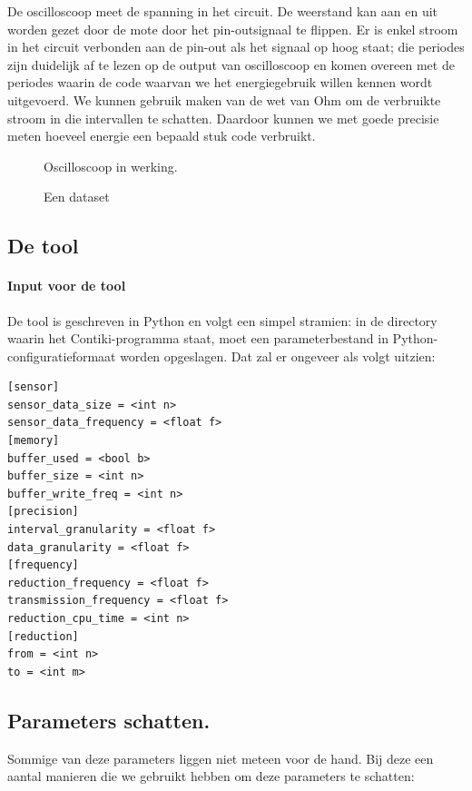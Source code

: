 \documentclass[11pt]{article}
\begin{document}
De oscilloscoop meet de spanning in het circuit. De weerstand kan aan en uit
worden gezet door de mote door het pin-outsignaal te flippen. Er is enkel stroom
in het circuit verbonden aan de pin-out als het signaal op hoog staat; die
periodes zijn duidelijk af te lezen op de output van oscilloscoop en komen
overeen met de periodes waarin de code waarvan we het energiegebruik willen
kennen wordt uitgevoerd. We kunnen gebruik maken van de wet van Ohm om de
verbruikte stroom in die intervallen te schatten. Daardoor kunnen we met goede
precisie meten hoeveel energie een bepaald stuk code verbruikt.
\begin{figure}[h]
\centering
\missingfigure{}
\caption{Oscilloscoop in werking.}
\label{fig:osc_werking}
\end{figure}

\begin{figure}[h]
\centering
\missingfigure{}
\caption{Een dataset}
\label{fig:data}
\end{figure}
\subsection{De tool}

\paragraph{Input voor de tool}
De tool is geschreven in Python en volgt een simpel stramien: in de directory
waarin het Contiki-programma staat, moet een parameterbestand in
Python-configuratieformaat worden opgeslagen. Dat zal er ongeveer als volgt
uitzien:

\begin{verbatim}
[sensor]
sensor_data_size = <int n>
sensor_data_frequency = <float f>
[memory]
buffer_used = <bool b>
buffer_size = <int n>
buffer_write_freq = <int n>
[precision]
interval_granularity = <float f>
data_granularity = <float f>
[frequency]
reduction_frequency = <float f>
transmission_frequency = <float f>
reduction_cpu_time = <int n>
[reduction]
from = <int n>
to = <int m>
\end{verbatim}

\subsection{Parameters schatten.} Sommige van deze parameters liggen niet meteen
voor de hand. Bij deze een aantal manieren die we gebruikt hebben om deze
parameters te schatten:
\end{document}
